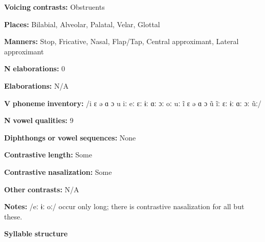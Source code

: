 \begin{styleBody}
\textbf{Voicing} \textbf{contrasts:} Obstruents
\end{styleBody}

\begin{styleBody}
\textbf{Places:} Bilabial, Alveolar, Palatal, Velar, Glottal
\end{styleBody}

\begin{styleBody}
\textbf{Manners:} Stop, Fricative, Nasal, Flap/Tap, Central approximant, Lateral approximant
\end{styleBody}

\begin{styleBody}
\textbf{N} \textbf{elaborations:} 0
\end{styleBody}

\begin{styleBody}
\textbf{Elaborations:} N/A
\end{styleBody}

\begin{styleBody}
\textbf{V} \textbf{phoneme} \textbf{inventory:} /i ɛ ə ɑ ɔ u iː eː ɛː ɨː ɑː ɔː oː uː ĩ ɛ ə ɑ ɔ ũ ĩː ɛː ɨː ɑː ɔː ũː/
\end{styleBody}

\begin{styleBody}
\textbf{N} \textbf{vowel} \textbf{qualities:} 9
\end{styleBody}

\begin{styleBody}
\textbf{Diphthongs} \textbf{or} \textbf{vowel} \textbf{sequences:} None
\end{styleBody}

\begin{styleBody}
\textbf{Contrastive} \textbf{length:} Some
\end{styleBody}

\begin{styleBody}
\textbf{Contrastive} \textbf{nasalization:} Some
\end{styleBody}

\begin{styleBody}
\textbf{Other} \textbf{contrasts:} N/A
\end{styleBody}

\begin{styleBody}
\textbf{Notes:} /eː ɨː oː/ occur only long; there is contrastive nasalization for all but these.
\end{styleBody}

\begin{styleBody}
\textbf{Syllable} \textbf{structure}
\end{styleBody}


